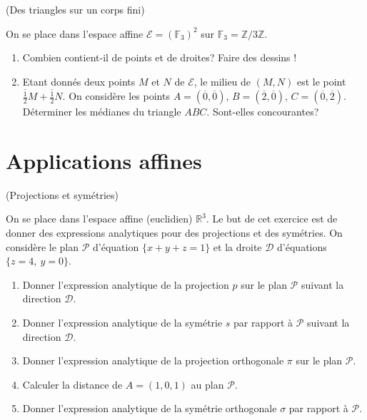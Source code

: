 \documentclass[a4paper,12pt,reqno]{amsart}
\begin{document}
\begin{exo} \hard (Des triangles sur un corps fini)

  On se place dans l'espace affine $\mathcal{E}=(\mathbb{F}_{3})^{2}$ sur $\mathbb{F}_{3}=\mathbb{Z}/3\mathbb{Z}$.

  \begin{enumerate}
    \item Combien contient-il de points et de droites? Faire des dessins !

    \item Etant donnés deux points $M$ et $N$ de $\mathcal{E}$, le milieu de $(M,N)$ est le point $\overline{\frac{1}{2}}M+\overline{\frac{1}{2}}N$. On considère les points $A=(\overline{0}, \overline{0})$, $B=(\overline{2}, \overline{0})$, $C=(\overline{0}, \overline{2})$. Déterminer les médianes du triangle $ABC$. Sont-elles concourantes?
  \end{enumerate}
\end{exo}


\section{Applications affines}

\begin{exo} (Projections et symétries)

  On se place dans l'espace affine (euclidien) $\mathbb{R}^{3}$. Le but de cet exercice est de donner des expressions analytiques pour des projections et des symétries. On considère le plan $\mathcal{P}$ d'équation $\{x+y+z=1\}$ et la droite $\mathcal{D}$ d'équations $\{z=4,\ y=0\}$.

  \begin{enumerate}

    \item Donner l'expression analytique de la projection $p$ sur le plan $\mathcal{P}$ suivant la direction $\mathcal{D}$.

    \item Donner l'expression analytique de la symétrie $s$ par rapport à $\mathcal{P}$ suivant la direction $\mathcal{D}$.

    \item Donner l'expression analytique de la projection orthogonale $\pi$ sur le plan $\mathcal{P}$.

    \item Calculer la distance de $A=(1,0,1)$ au plan $\mathcal{P}$.

    \item Donner l'expression analytique de la symétrie orthogonale $\sigma$ par rapport à $\mathcal{P}$.

  \end{enumerate}
\end{exo}
\end{document}
